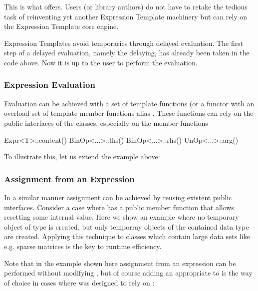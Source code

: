 This is what \Daixtrose offers. Users (or library authors) do not have to retake
the tedious task of reinventing yet another Expression Template machinery but
can rely on the \Daixtrose Expression Template core engine.

Expression Templates avoid temporaries through delayed evaluation.  The first
step of a delayed evaluation, namely the delaying, has already been taken in the
code above. Now it is up to the user to perform the evaluation. 

\subsubsection{Expression Evaluation}

Evaluation can
be achieved with a set of template functions (or a functor with an overload set
of template member functions alias .  These functions can
rely on the public interfaces of the \Daixtrose classes, especially on the
member functions  
%
\begin{code}
Expr<T>::content()
BinOp<...>::lhs()
BinOp<...>::rhs()
UnOp<...>::arg()
\end{code}

To illustrate this, let us extend the example above:
%


\subsubsection{Assignment from an Expression}

In a similar manner assignment can be achieved by reusing existent public
interfaces. Consider a case where  has a public member
function that allows resetting some internal value. Here we show an example
where no temporary object of type  is created, but only temporray
objects of the contained data type are created.  Applying this technique to
classes which contain large data sets like e.g. sparse matrices is the key to
runtime efficiency. 

 


Note that in the example shown here assignment from an expression can be
performed without modifying , but of course adding an
appropriate  to  is the way of choice in
cases where  was designed to rely on \Daixtrose:


